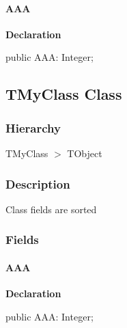 \documentclass{report}
\begin{document}
\paragraph*{AAA}\hspace*{\fill}

\begin{list}{}{
\setlength{\itemindent}{0cm}
\setlength{\listparindent}{0cm}
\setlength{\leftmargin}{\evensidemargin}
\addtolength{\leftmargin}{\tmplength}
\settowidth{\labelsep}{X}
\addtolength{\leftmargin}{\labelsep}
\setlength{\labelwidth}{\tmplength}
}
\begin{flushleft}
\item[\textbf{Declaration}\hfill]
\begin{ttfamily}
public AAA: Integer;\end{ttfamily}


\end{flushleft}
\end{list}
\subsection*{TMyClass Class}
\subsubsection*{\large{\textbf{Hierarchy}}\normalsize\hspace{1ex}\hfill}
TMyClass {$>$} TObject
\subsubsection*{\large{\textbf{Description}}\normalsize\hspace{1ex}\hfill}
Class fields are sorted\subsubsection*{\large{\textbf{Fields}}\normalsize\hspace{1ex}\hfill}
\paragraph*{AAA}\hspace*{\fill}

\begin{list}{}{
\setlength{\itemindent}{0cm}
\setlength{\listparindent}{0cm}
\setlength{\leftmargin}{\evensidemargin}
\addtolength{\leftmargin}{\tmplength}
\settowidth{\labelsep}{X}
\addtolength{\leftmargin}{\labelsep}
\setlength{\labelwidth}{\tmplength}
}
\begin{flushleft}
\item[\textbf{Declaration}\hfill]
\begin{ttfamily}
public AAA: Integer;\end{ttfamily}


\end{flushleft}
\end{list}
\end{document}
